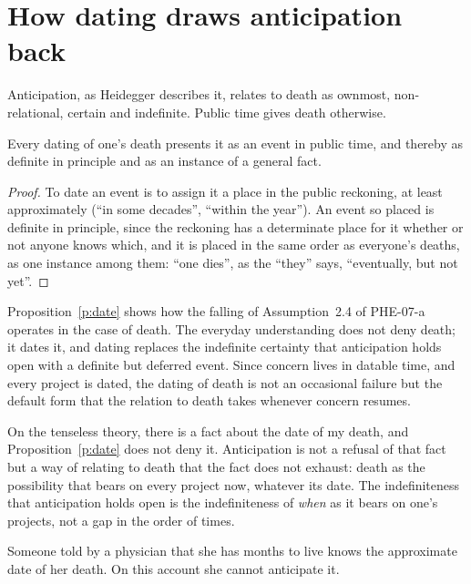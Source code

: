 \documentclass{situationist-preprint}
\begin{document}
\section{How dating draws anticipation back}

Anticipation, as Heidegger describes it, relates to death as ownmost, non-relational, certain and indefinite. Public time gives death otherwise.

\begin{proposition}\label{p:date}
Every dating of one's death presents it as an event in public time, and thereby as definite in principle and as an instance of a general fact.
\end{proposition}

\begin{proof}
To date an event is to assign it a place in the public reckoning, at least approximately (\enquote{in some decades}, \enquote{within the year}). An event so placed is definite in principle, since the reckoning has a determinate place for it whether or not anyone knows which, and it is placed in the same order as everyone's deaths, as one instance among them: \enquote{one dies}, as the \enquote{they} says, \enquote{eventually, but not yet}.
\end{proof}

Proposition~\ref{p:date} shows how the falling of Assumption~2.4 of PHE-07-a operates in the case of death. The everyday understanding does not deny death; it dates it, and dating replaces the indefinite certainty that anticipation holds open with a definite but deferred event. Since concern lives in datable time, and every project is dated, the dating of death is not an occasional failure but the default form that the relation to death takes whenever concern resumes.

On the tenseless theory, there is a fact about the date of my death, and Proposition~\ref{p:date} does not deny it. Anticipation is not a refusal of that fact but a way of relating to death that the fact does not exhaust: death as the possibility that bears on every project now, whatever its date. The indefiniteness that anticipation holds open is the indefiniteness of \emph{when} as it bears on one's projects, not a gap in the order of times.

\begin{objection}
Someone told by a physician that she has months to live knows the approximate date of her death. On this account she cannot anticipate it.
\end{objection}
\end{document}
